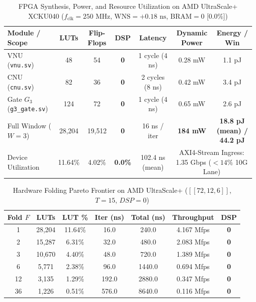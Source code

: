 \documentclass[journal]{IEEEtran}
\begin{document}
\begin{table}[t]
\caption{FPGA Synthesis, Power, and Resource Utilization on AMD UltraScale+ XCKU040 ($f_{\text{clk}} = 250\text{ MHz}$, $\text{WNS} = +0.18\text{ ns}$, $\text{BRAM} = 0$ [0.0\%])}
\label{tab:hardware_synth}
\centering
\begin{tabular}{lcccccc}
\toprule
\textbf{Module / Scope} & \textbf{LUTs} & \textbf{Flip-Flops} & \textbf{DSP} & \textbf{Latency} & \textbf{Dynamic Power} & \textbf{Energy / Win} \\
\midrule
VNU (\texttt{vnu.sv}) & 48 & 54 & \textbf{0} & 1 cycle (4 ns) & 0.28 mW & 1.1 pJ \\
CNU (\texttt{cnu.sv}) & 82 & 36 & \textbf{0} & 2 cycles (8 ns) & 0.42 mW & 3.4 pJ \\
Gate $G_3$ (\texttt{g3\_gate.sv}) & 124 & 72 & \textbf{0} & 1 cycle (4 ns) & 0.65 mW & 2.6 pJ \\
\midrule
Full Window ($W=3$) & 28,204 & 19,512 & \textbf{0} & 16 ns / iter & \textbf{184 mW} & \textbf{18.8 pJ (mean) / 44.2 pJ} \\
Device Utilization & 11.64\% & 4.02\% & \textbf{0.0\%} & 102.4 ns (mean) & \multicolumn{2}{c}{AXI4-Stream Ingress: 1.35 Gbps ($<14\%$ 10G Lane)} \\
\bottomrule
\end{tabular}
\end{table}

\begin{table}[t]
\caption{Hardware Folding Pareto Frontier on AMD UltraScale+ ($[[72,12,6]]$, $T=15$, $DSP=0$)}
\label{tab:hardware_folding}
\centering
\begin{tabular}{ccccccc}
\toprule
\textbf{Fold $F$} & \textbf{LUTs} & \textbf{LUT \%} & \textbf{Iter (ns)} & \textbf{Total (ns)} & \textbf{Throughput} & \textbf{DSP} \\
\midrule
1  & 28,204 & 11.64\% & 16.0  & 240.0  & 4.167 Mfps & \textbf{0} \\
2  & 15,287 & 6.31\%  & 32.0  & 480.0  & 2.083 Mfps & \textbf{0} \\
3  & 10,670 & 4.40\%  & 48.0  & 720.0  & 1.389 Mfps & \textbf{0} \\
6  & 5,771  & 2.38\%  & 96.0  & 1440.0 & 0.694 Mfps & \textbf{0} \\
12 & 3,135  & 1.29\%  & 192.0 & 2880.0 & 0.347 Mfps & \textbf{0} \\
36 & 1,226  & 0.51\%  & 576.0 & 8640.0 & 0.116 Mfps & \textbf{0} \\
\bottomrule
\end{tabular}
\end{table}
\end{document}
